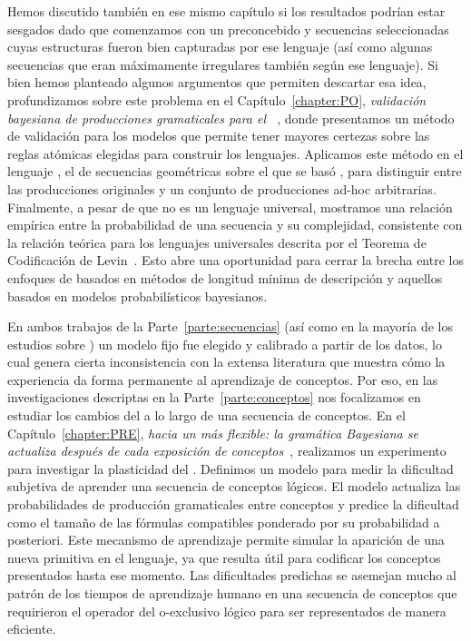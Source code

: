 Hemos discutido también en ese mismo capítulo si los resultados podrían estar sesgados dado que comenzamos con un \lot preconcebido y secuencias seleccionadas cuyas estructuras fueron bien capturadas por ese lenguaje (así como algunas secuencias que eran máximamente irregulares también según ese lenguaje). Si bien hemos planteado algunos argumentos que permiten descartar esa idea, profundizamos sobre este problema en el Capítulo~\ref{chapter:PO}, \textit{validación bayesiana de producciones gramaticales para el \lot~\cite{romano2018bayesian}}, donde presentamos un método de validación para los modelos \lot que permite tener mayores certezas sobre las reglas atómicas elegidas para construir los lenguajes. Aplicamos este método en el lenguaje \gramgeo, el \lot de secuencias geométricas sobre el que se basó \grambin, para distinguir entre las producciones originales y un conjunto de producciones ad-hoc arbitrarias. Finalmente, a pesar de que \gramgeo no es un lenguaje universal, mostramos una relación empírica entre la probabilidad de una secuencia y su complejidad, consistente con la relación teórica para los lenguajes universales descrita por el Teorema de Codificación de Levin~\cite{levin1974laws}. Esto abre una oportunidad para cerrar la brecha entre los enfoques de \lot basados en métodos de longitud mínima de descripción y aquellos basados en modelos probabilísticos bayesianos.

En ambos trabajos de la Parte~\ref{parte:secuencias} (así como en la mayoría de los estudios sobre \lot) un modelo fijo fue elegido y calibrado a partir de los datos, lo cual genera cierta inconsistencia con la extensa literatura que muestra cómo la experiencia da forma permanente al aprendizaje de conceptos. Por eso, en las investigaciones descriptas en la Parte~\ref{parte:conceptos} nos focalizamos en estudiar los cambios del \lot a lo largo de una secuencia de conceptos. En el Capítulo~\ref{chapter:PRE}, \textit{hacia un \lot más flexible: la gramática Bayesiana se actualiza después de cada exposición de conceptos~\cite{tano2020towards}}, realizamos un experimento para investigar la plasticidad del \lot. Definimos un modelo para medir la dificultad subjetiva de aprender una secuencia de conceptos lógicos. El modelo actualiza las probabilidades de producción gramaticales entre conceptos y predice la dificultad como el tamaño de las fórmulas compatibles ponderado por su probabilidad a posteriori. Este mecanismo de aprendizaje permite simular la aparición de una nueva primitiva en el lenguaje, ya que resulta útil para codificar los conceptos presentados hasta ese momento. Las dificultades predichas se asemejan mucho al patrón de los tiempos de aprendizaje humano en una secuencia de conceptos que requirieron el operador del o-exclusivo lógico para ser representados de manera eficiente.

